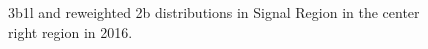 \begin{figure}[ht]
 

    \caption{3b1l and reweighted 2b distributions in Signal Region in the center right region in 2016.}
    \label{fig:center-right-3b1l-SR-2016}
\end{figure}


